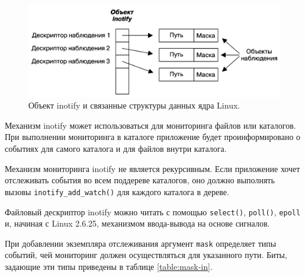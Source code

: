 \documentclass[14pt, russian]{scrartcl}
\newcommand{\code}[1]{\texttt{#1}}
\begin{document}
\begin{figure}[H]
  \centering
  \begin{minipage}[t]{.9\textwidth}
    \centering
    \includegraphics[width=.9\textwidth]{./imgs/inotify_object.png}
  \end{minipage}
  \caption{Объект inotify и связанные структуры данных ядра Linux.}
  \label{fig:inotify_object}
\end{figure}

Механизм inotify может использоваться для мониторинга файлов или каталогов. При
выполнении мониторинга в каталоге приложение будет проинформировано о событиях
для самого каталога и для файлов внутри каталога.

Механизм мониторинга inotify не является рекурсивным. Если приложение хочет
отслеживать события во всем поддереве каталогов, оно должно выполнять вызовы
\code{inotify\_add\_watch()} для каждого каталога в дереве.

Файловый дескриптор inotify можно читать с помощью \code{select()},
\code{poll()}, \code{epoll} и, начиная с Linux 2.6.25, механизмом ввода-вывода
на основе сигналов.

При добавлении экземпляра отслеживания аргумент \code{mask} определяет типы
событий, чей мониторинг должен осуществляться для указанного пути. Биты,
задающие эти типы приведены в таблице \ref{table:mask-in}.
\end{document}
